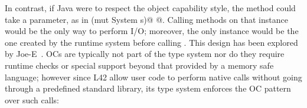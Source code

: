 In contrast, if Java were to respect the object capability style, the \Q@main@ method could take a \Q@System@ parameter, as in
 \Q@main(mut System s)@
 \lstset{language=Java}
@. \lstset{language=FortyTwo}%
Calling methods on that \Q@System@ instance would be the only way to perform I/O;
moreover, the only \Q@System@ instance would be the one created by the runtime system before calling \Q@main@. %
This design has been explored by Joe-E~\cite{finifter2008verifiable}.
OCs are typically not part of the type system nor do they require runtime checks or special support beyond that provided by a memory safe language; however since
L42 allow user code to perform native calls without going through a predefined standard library, its type system enforces the OC pattern over such calls:
